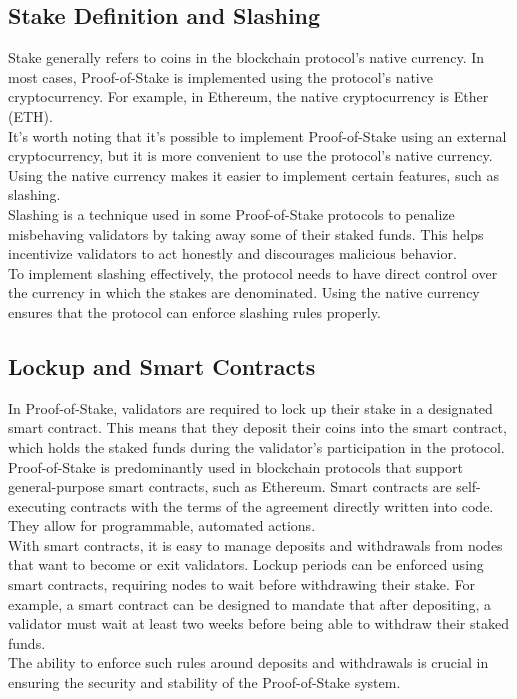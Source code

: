 \subsection{Stake Definition and Slashing}
Stake generally refers to coins in the blockchain protocol's native currency. In most cases, Proof-of-Stake is implemented using the protocol's native cryptocurrency. For example, in Ethereum, the native cryptocurrency is Ether (ETH).\\
It's worth noting that it's possible to implement Proof-of-Stake using an external cryptocurrency, but it is more convenient to use the protocol's native currency. Using the native currency makes it easier to implement certain features, such as slashing.\\
Slashing is a technique used in some Proof-of-Stake protocols to penalize misbehaving validators by taking away some of their staked funds. This helps incentivize validators to act honestly and discourages malicious behavior.\\
To implement slashing effectively, the protocol needs to have direct control over the currency in which the stakes are denominated. Using the native currency ensures that the protocol can enforce slashing rules properly.

\subsection{Lockup and Smart Contracts}
In Proof-of-Stake, validators are required to lock up their stake in a designated smart contract. This means that they deposit their coins into the smart contract, which holds the staked funds during the validator's participation in the protocol.\\
Proof-of-Stake is predominantly used in blockchain protocols that support general-purpose smart contracts, such as Ethereum. Smart contracts are self-executing contracts with the terms of the agreement directly written into code. They allow for programmable, automated actions.\\
With smart contracts, it is easy to manage deposits and withdrawals from nodes that want to become or exit validators. Lockup periods can be enforced using smart contracts, requiring nodes to wait before withdrawing their stake. For example, a smart contract can be designed to mandate that after depositing, a validator must wait at least two weeks before being able to withdraw their staked funds.\\
The ability to enforce such rules around deposits and withdrawals is crucial in ensuring the security and stability of the Proof-of-Stake system.

